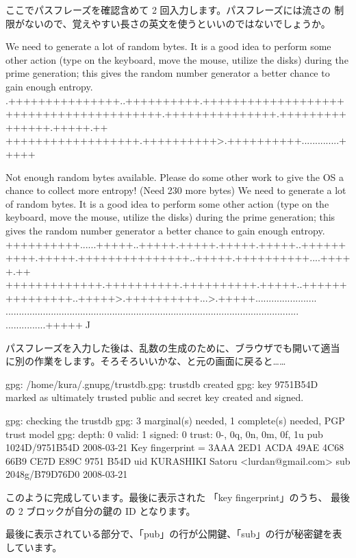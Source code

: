 \documentclass[mingoth,a4paper]{jsarticle}
\begin{document}
ここでパスフレーズを確認含めて 2 回入力します。パスフレーズには流さの
制限がないので、覚えやすい長さの英文を使うといいのではないでしょうか。

\begin{commandline}
We need to generate a lot of random bytes. It is a good idea to perform
some other action (type on the keyboard, move the mouse, utilize the
disks) during the prime generation; this gives the random number
generator a better chance to gain enough entropy.
.+++++++++++++++..++++++++++.++++++++++++++++++++++++++++++++++++++++.+++++++++++++++.+++++++++++++++.+++++.++
++++++++++++++++++.++++++++++>.++++++++++..............+++++

Not enough random bytes available.  Please do some other work to give
the OS a chance to collect more entropy! (Need 230 more bytes)
We need to generate a lot of random bytes. It is a good idea to perform
some other action (type on the keyboard, move the mouse, utilize the
disks) during the prime generation; this gives the random number
generator a better chance to gain enough entropy.
++++++++++......+++++..+++++.+++++.+++++.+++++..++++++++++.+++++.+++++++++++++++..+++++.++++++++++....+++++.++
+++++++++++++.++++++++++.++++++++++.+++++..+++++++++++++++..+++++>.++++++++++...>.+++++.......................
..............................................................................................................
...............+++++^^^^^
\end{commandline}

パスフレーズを入力した後は、乱数の生成のために、ブラウザでも開いて適当
に別の作業をします。そろそろいいかな、と元の画面に戻ると……

\begin{commandline}
gpg: /home/kura/.gnupg/trustdb.gpg: trustdb created
gpg: key 9751B54D marked as ultimately trusted
public and secret key created and signed.

gpg: checking the trustdb
gpg: 3 marginal(s) needed, 1 complete(s) needed, PGP trust model
gpg: depth: 0  valid:   1  signed:   0  trust: 0-, 0q, 0n, 0m, 0f, 1u
pub   1024D/9751B54D 2008-03-21
      Key fingerprint = 3AAA 2ED1 ACDA 49AE 4C68  66B9 CE7D E89C 9751 B54D
uid                  KURASHIKI Satoru <lurdan@gmail.com>
sub   2048g/B79D76D0 2008-03-21
\end{commandline}

このように完成しています。最後に表示された 「key fingerprint」のうち、
最後の 2 ブロックが自分の鍵の ID となります。

最後に表示されている部分で、「pub」の行が公開鍵、「sub」の行が秘密鍵を表
しています。
\end{document}

